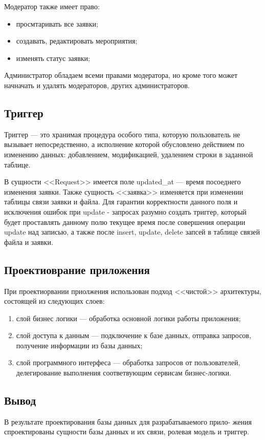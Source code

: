 Модератор также имеет право:
\begin{itemize}[label=---]
	\item просмтаривать все заявки;
	\item создавать, редактировать мероприятия;
	\item изменять статус заявки;
\end{itemize}

Администратор обладаем всеми правами модератора, но кроме того может начначать и удалять модераторов, других администраторов.

\subsection{Триггер}

Триггер — это хранимая процедура особого типа, которую пользователь не вызывает непосредственно, а исполнение которой обусловлено действием по изменению данных: добавлением, модификацией, удалением строки в заданной таблице.

В сущности <<Request>> имеется поле updated{\_}at --- время посоеднего изменения заявки. Также сущность <<заявка>> изменяется при изменении таблицы связи заявки и файла. Для гарантии корректности данного поля и исключения ошибок при update - запросах разумно создать триггер, который будет проставлять данному полю текущее время после совершения операции update над записью, а также после insert, update, delete запсей в таблице связей файла и заявки.

\subsection{Проектиоврание приложения}

При проектиорвании приолжения использован подход <<чистой>>\cite{clean-code} архитектуры, состоящей из следующих слоев:
\begin{enumerate}
	\item слой бизнес логики --- обработка основной логики работы приложения;
	\item слой доступа к данным --- подключение к базе данных, отправка запросов, получение информации из базы данных;
	\item слой программного интерфеса --- обработка запросов от пользователей, делегирование выполнения соответвующим сервисам бизнес-логики.
\end{enumerate}

\subsection{Вывод}

В результате проектирования базы данных для разрабатываемого прило-
жения спроектированы сущности базы данных и их связи, ролевая модель и триггер.

\pagebreak
